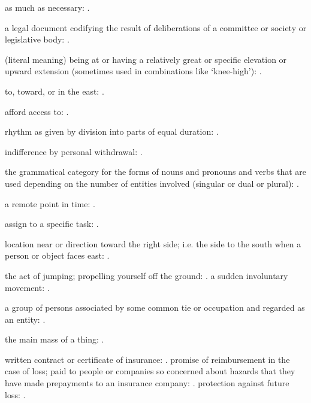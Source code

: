   as much as necessary: .

  a legal document codifying the result of deliberations of a committee or society or legislative body:   .

  (literal meaning) being at or having a relatively great or specific elevation or upward extension (sometimes used in combinations like `knee-high'): .

  to, toward, or in the east: .

  afford access to:   .

  rhythm as given by division into parts of equal duration:   .

  indifference by personal withdrawal:   .

  the grammatical category for the forms of nouns and pronouns and verbs that are used depending on the number of entities involved (singular or dual or plural): .

  a remote point in time:   .

  assign to a specific task: .

  location near or direction toward the right side; i.e. the side to the south when a person or object faces east: .

  the act of jumping; propelling yourself off the ground:   . a sudden involuntary movement:   .

  a group of persons associated by some common tie or occupation and regarded as an entity: .

  the main mass of a thing: .

  written contract or certificate of insurance:   . promise of reimbursement in the case of loss; paid to people or companies so concerned about hazards that they have made prepayments to an insurance company: . protection against future loss:   .

